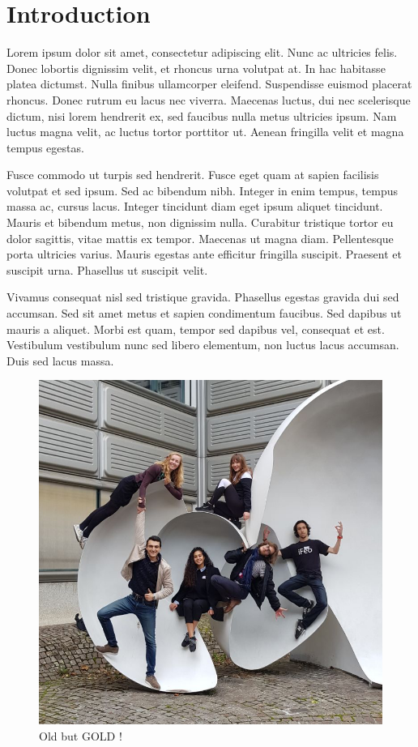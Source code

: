 \newpage
\section{Introduction}
\label{sec:introduction}


Lorem ipsum dolor sit amet, consectetur adipiscing elit. Nunc ac ultricies felis. Donec lobortis dignissim velit, et rhoncus urna volutpat at. In hac habitasse platea dictumst. Nulla finibus ullamcorper eleifend. Suspendisse euismod placerat rhoncus. Donec rutrum eu lacus nec viverra. Maecenas luctus, dui nec scelerisque dictum, nisi lorem hendrerit ex, sed faucibus nulla metus ultricies ipsum. Nam luctus magna velit, ac luctus tortor porttitor ut. Aenean fringilla velit et magna tempus egestas.

\medskip Fusce commodo ut turpis sed hendrerit. Fusce eget quam at sapien facilisis volutpat et sed ipsum. Sed ac bibendum nibh. Integer in enim tempus, tempus massa ac, cursus lacus. Integer tincidunt diam eget ipsum aliquet tincidunt. Mauris et bibendum metus, non dignissim nulla. Curabitur tristique tortor eu dolor sagittis, vitae mattis ex tempor. Maecenas ut magna diam. Pellentesque porta ultricies varius. Mauris egestas ante efficitur fringilla suscipit. Praesent et suscipit urna. Phasellus ut suscipit velit.

\medskip Vivamus consequat nisl sed tristique gravida. Phasellus egestas gravida dui sed accumsan. Sed sit amet metus et sapien condimentum faucibus. Sed dapibus ut mauris a aliquet. Morbi est quam, tempor sed dapibus vel, consequat et est. Vestibulum vestibulum nunc sed libero elementum, non luctus lacus accumsan. Duis sed lacus massa.

\vspace{1cm}
\begin{figure}[ht]
    \centering
    \includegraphics[scale=0.3]{images/CHIC.png}
    \caption{Old but GOLD !}
    \label{fig:CHIC}
\end{figure}